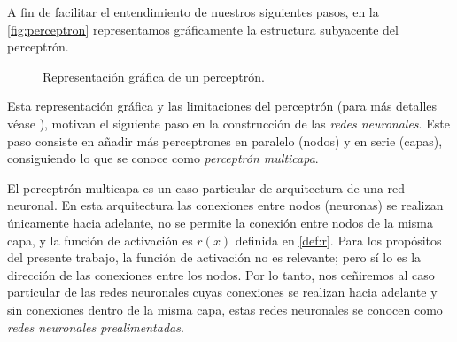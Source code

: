 \documentclass[12pt, a4paper, twoside]{book}
\numberwithin{equation}{section}
\theoremstyle{definition}
\theoremstyle{remark}
\theoremstyle{plain}
\begin{document}
	A fin de facilitar el entendimiento de nuestros siguientes pasos, 
	en la \autoref{fig:perceptron} representamos gráficamente la 
	estructura subyacente del perceptrón.
	\begin{figure}[!htbp]
		\centering
		\caption{Representación gráfica de un perceptrón.}
		\label{fig:perceptron}
	\end{figure}
	
	
	
	Esta representación gráfica y las limitaciones del perceptrón (para 
	más detalles véase \cite{Perceptron-Convergencia}), motivan el 
	siguiente paso en la 
	construcción de las \emph{redes neuronales}. Este paso consiste en 
	añadir más perceptrones en paralelo (nodos) y en serie (capas), 
	consiguiendo lo que se conoce como \emph{perceptrón multicapa}.

	El perceptrón multicapa es un caso particular de arquitectura de una red 
	neuronal. En esta arquitectura las conexiones entre nodos (neuronas) 
	se realizan únicamente hacia adelante, no se permite la conexión 
	entre nodos de la misma capa, y la función de activación es 
	$r(x)$ definida en \ref{def:r}. Para los propósitos del presente 
	trabajo, la función de activación no es relevante; pero sí lo es la 
	dirección de las conexiones entre los nodos. Por lo tanto, nos 
	ceñiremos al caso particular de las redes neuronales cuyas conexiones
	se realizan hacia adelante y sin conexiones dentro de la misma capa, 
	estas redes neuronales se conocen como \emph{redes neuronales 
	prealimentadas}. 
	
\end{document}
